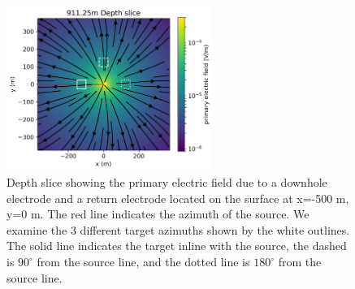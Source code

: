 \begin{figure}
    \begin{center}
    \includegraphics[width=0.6\textwidth]{figures/primary_3D.png}
    \end{center}
\caption{
    Depth slice showing the primary electric field due to a downhole
    electrode and a return electrode located on the surface at x=-500 m, y=0 m. The red line indicates the
    azimuth of the source.
    We examine the 3 different target azimuths shown by the white outlines.
    The solid line indicates the target inline with the source,
    the dashed is $90^\circ$ from the source line, and the dotted line is $180^\circ$ from the source line.
}
\label{fig:primary_3D}
\end{figure}
